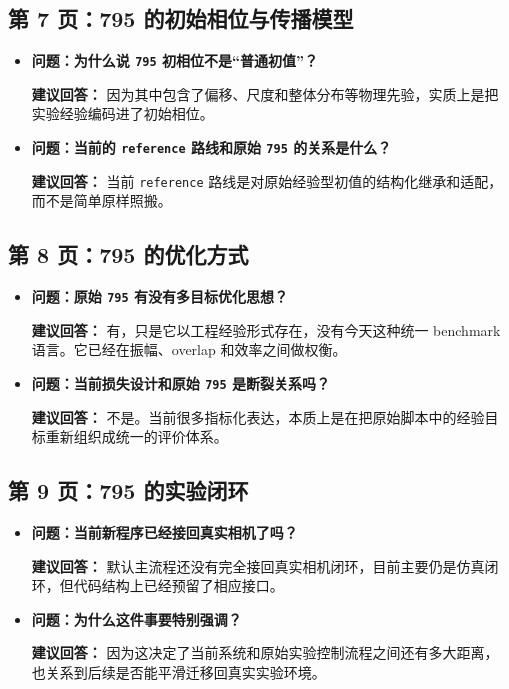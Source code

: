 \documentclass[12pt,a4paper]{ctexart}
\begin{document}
\subsection{第 7 页：795 的初始相位与传播模型}
\begin{itemize}
\item \textbf{问题：为什么说 \texttt{795} 初相位不是“普通初值”？}

\textbf{建议回答：} 因为其中包含了偏移、尺度和整体分布等物理先验，实质上是把实验经验编码进了初始相位。

\item \textbf{问题：当前的 \texttt{reference} 路线和原始 \texttt{795} 的关系是什么？}

\textbf{建议回答：} 当前 \texttt{reference} 路线是对原始经验型初值的结构化继承和适配，而不是简单原样照搬。
\end{itemize}

\subsection{第 8 页：795 的优化方式}
\begin{itemize}
\item \textbf{问题：原始 \texttt{795} 有没有多目标优化思想？}

\textbf{建议回答：} 有，只是它以工程经验形式存在，没有今天这种统一 benchmark 语言。它已经在振幅、overlap 和效率之间做权衡。

\item \textbf{问题：当前损失设计和原始 \texttt{795} 是断裂关系吗？}

\textbf{建议回答：} 不是。当前很多指标化表达，本质上是在把原始脚本中的经验目标重新组织成统一的评价体系。
\end{itemize}

\subsection{第 9 页：795 的实验闭环}
\begin{itemize}
\item \textbf{问题：当前新程序已经接回真实相机了吗？}

\textbf{建议回答：} 默认主流程还没有完全接回真实相机闭环，目前主要仍是仿真闭环，但代码结构上已经预留了相应接口。

\item \textbf{问题：为什么这件事要特别强调？}

\textbf{建议回答：} 因为这决定了当前系统和原始实验控制流程之间还有多大距离，也关系到后续是否能平滑迁移回真实实验环境。
\end{itemize}
\end{document}
